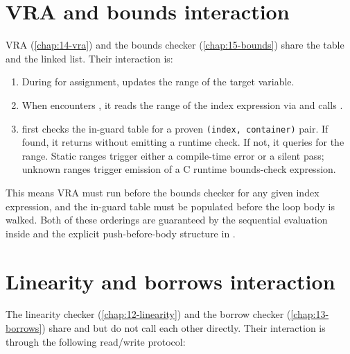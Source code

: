 \section{VRA and bounds interaction}
\label{sec:ci-vra-bounds}

\pnum
VRA (\cref{chap:14-vra}) and the bounds checker (\cref{chap:15-bounds}) share
the  table and the  linked list.
Their interaction is:

\begin{enumerate}
\item During  for  assignment,
   updates the range of the target variable.
\item When  encounters , it reads
  the range of the index expression via  and calls
  .
\item {} first checks the in-guard table for a proven
  \texttt{(index, container)} pair.  If found, it returns without emitting a
  runtime check.  If not, it queries  for the range.
  Static ranges trigger either a compile-time error or a silent pass;
  unknown ranges trigger emission of a C runtime bounds-check expression.
\end{enumerate}

\pnum
This means VRA must run before the bounds checker for any given index
expression, and the in-guard table must be populated before the loop body is
walked.  Both of these orderings are guaranteed by the sequential evaluation
inside  and the explicit push-before-body structure
in .

\section{Linearity and borrows interaction}
\label{sec:ci-lin-borrow}

\pnum
The linearity checker (\cref{chap:12-linearity}) and the borrow checker
(\cref{chap:13-borrows}) share  and 
but do not call each other directly.  Their interaction is through the following
read/write protocol:

